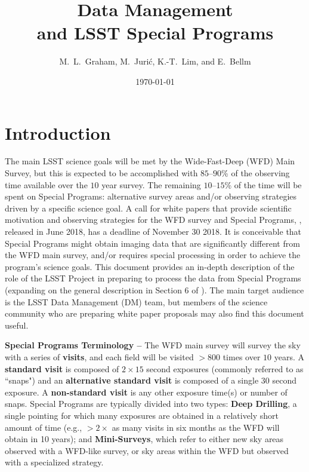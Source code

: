 \documentclass[DM,lsstdoc,toc]{lsstdoc}
\title[LSST Special Programs]{Data Management \\ and LSST Special Programs}
\author{M.~L.~Graham, M.~Juri\'{c}, K.-T.~Lim, and E.~Bellm}
\date{\today}
\begin{document}
\maketitle




\section{Introduction} \label{sec:intro}

The main LSST science goals will be met by the Wide-Fast-Deep (WFD) Main Survey, but this is expected to be accomplished with $85$--$90$\% of the observing time available over the $10$ year survey. The remaining $10$--$15$\% of the time will be spent on Special Programs: alternative survey areas and/or observing strategies driven by a specific science goal. A call for white papers that provide scientific motivation and observing strategies for the WFD survey and Special Programs, , released in June 2018, has a deadline of November 30 2018. It is conceivable that Special Programs might obtain imaging data that are significantly different from the WFD main survey, and/or requires special processing in order to achieve the program's science goals. This document provides an in-depth description of the role of the LSST Project in preparing to process the data from Special Programs (expanding on the general description in Section 6 of ). The main target audience is the LSST Data Management (DM) team, but members of the science community who are preparing white paper proposals may also find this document useful.

{\bf Special Programs Terminology -- } The WFD main survey will survey the sky with a series of {\bf visits}, and each field will be visited $>800$ times over $10$ years. A {\bf standard visit} is composed of $2\times15$ second exposures (commonly referred to as ``snaps") and an {\bf alternative standard visit} is composed of a single $30$ second exposure. A {\bf non-standard visit} is any other exposure time(s) or number of snaps. Special Programs are typically divided into two types: {\bf Deep Drilling}, a single pointing for which many exposures are obtained in a relatively short amount of time (e.g., $>2\times$ as many visits in six months as the WFD will obtain in 10 years); and {\bf Mini-Surveys}, which refer to either new sky areas observed with a WFD-like survey, or sky areas within the WFD but observed with a specialized strategy. 
\end{document}

